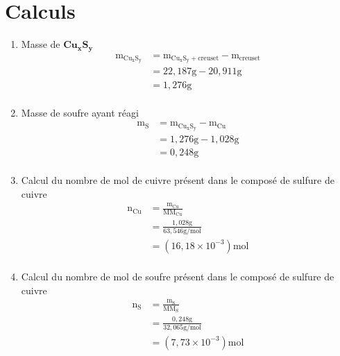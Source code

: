 \documentclass[11pt]{article}
\begin{document}
\section*{Calculs}
\begin{enumerate}\bfseries
\item Masse de $\mathbf{Cu_xS_y}$
\begin{equation*}
\begin{split}
\mathrm{m_{Cu_xS_y}}&=\mathrm{m_{Cu_xS_y+creuset}-\mathrm{m_{creuset}}}\\
	                &=22,187\mathrm{g}-20,911\mathrm{g}\\
	                &=1,276\mathrm{g}\\
\end{split}
\end{equation*}

\item Masse de soufre ayant réagi
\begin{equation*}
\begin{split}
\mathrm{m_{S}}&=\mathrm{m_{Cu_xS_y}-\mathrm{m_{Cu}}}\\
	          &=1,276\mathrm{g}-1,028\mathrm{g}\\
	          &=0,248\mathrm{g}\\
\end{split}
\end{equation*}

\item Calcul du nombre de mol de cuivre présent dans le composé de sulfure de cuivre
\begin{equation*}
\begin{split}
\mathrm{n_{Cu}}&=\frac{\mathrm{m_{Cu}}}{\mathrm{MM_{Cu}}}\\
               &=\frac{1,028\mathrm{g}}{63,546\mathrm{g/mol}}\\
	           &=(16,18\times10^{-3})\mathrm{mol}\\
\end{split}
\end{equation*}

\item Calcul du nombre de mol de soufre présent dans le composé de sulfure de cuivre
\begin{equation*}
\begin{split}
\mathrm{n_{S}}&=\frac{\mathrm{m_{S}}}{\mathrm{MM_{S}}}\\
              &=\frac{0,248\mathrm{g}}{32,065\mathrm{g/mol}}\\
              &=(7,73\times10^{-3})\mathrm{mol}\\
\end{split}
\end{equation*}


\end{enumerate}
\end{document}
